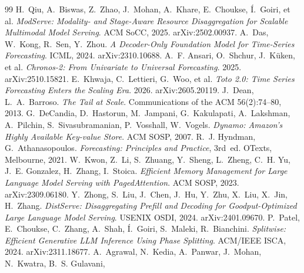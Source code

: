 \begin{thebibliography}{99}
H.~Qiu, A.~Biswas, Z.~Zhao, J.~Mohan, A.~Khare, E.~Choukse, {\'I}.~Goiri,
et al.
\emph{ModServe: Modality- and Stage-Aware Resource Disaggregation for
Scalable Multimodal Model Serving}.
ACM SoCC, 2025. arXiv:2502.00937.
A.~Das, W.~Kong, R.~Sen, Y.~Zhou.
\emph{A Decoder-Only Foundation Model for Time-Series Forecasting}.
ICML, 2024. arXiv:2310.10688.
A.~F. Ansari, O.~Shchur, J.~K\"uken, et al.
\emph{Chronos-2: From Univariate to Universal Forecasting}.
2025. arXiv:2510.15821.
E.~Khwaja, C.~Lettieri, G.~Woo, et al.
\emph{Toto 2.0: Time Series Forecasting Enters the Scaling Era}.
2026. arXiv:2605.20119.
J.~Dean, L.~A.~Barroso.
\emph{The Tail at Scale}.
Communications of the ACM 56(2):74--80, 2013.
G.~DeCandia, D.~Hastorun, M.~Jampani, G.~Kakulapati, A.~Lakshman,
A.~Pilchin, S.~Sivasubramanian, P.~Vosshall, W.~Vogels.
\emph{Dynamo: Amazon's Highly Available Key-value Store}.
ACM SOSP, 2007.
R.~J. Hyndman, G.~Athanasopoulos.
\emph{Forecasting: Principles and Practice}, 3rd~ed.
OTexts, Melbourne, 2021.
W.~Kwon, Z.~Li, S.~Zhuang, Y.~Sheng, L.~Zheng, C.~H. Yu, J.~E. Gonzalez,
H.~Zhang, I.~Stoica.
\emph{Efficient Memory Management for Large Language Model Serving with
PagedAttention}.
ACM SOSP, 2023. arXiv:2309.06180.
Y.~Zhong, S.~Liu, J.~Chen, J.~Hu, Y.~Zhu, X.~Liu, X.~Jin, H.~Zhang.
\emph{DistServe: Disaggregating Prefill and Decoding for Goodput-Optimized
Large Language Model Serving}.
USENIX OSDI, 2024. arXiv:2401.09670.
P.~Patel, E.~Choukse, C.~Zhang, A.~Shah, {\'I}.~Goiri, S.~Maleki,
R.~Bianchini.
\emph{Splitwise: Efficient Generative LLM Inference Using Phase Splitting}.
ACM/IEEE ISCA, 2024. arXiv:2311.18677.
A.~Agrawal, N.~Kedia, A.~Panwar, J.~Mohan, N.~Kwatra, B.~S. Gulavani,

\end{thebibliography}
